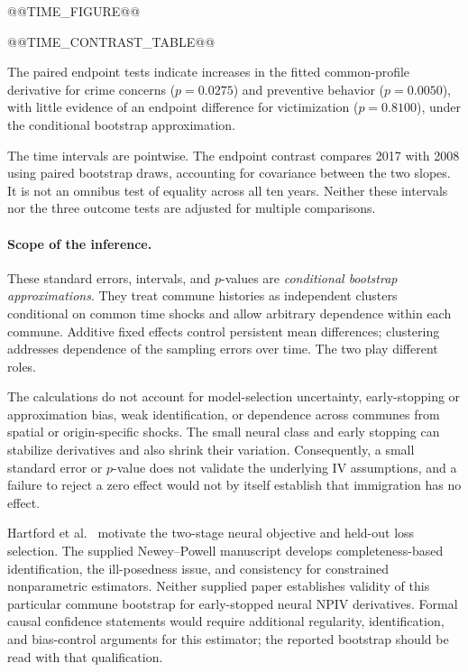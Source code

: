 @@TIME_FIGURE@@

@@TIME_CONTRAST_TABLE@@

The paired endpoint tests indicate increases in the fitted common-profile derivative for crime concerns ($p=0.0275$) and preventive behavior ($p=0.0050$), with little evidence of an endpoint difference for victimization ($p=0.8100$), under the conditional bootstrap approximation.

The time intervals are pointwise. The endpoint contrast compares 2017 with 2008 using paired bootstrap draws, accounting for covariance between the two slopes. It is not an omnibus test of equality across all ten years. Neither these intervals nor the three outcome tests are adjusted for multiple comparisons.

\paragraph{Scope of the inference.}
These standard errors, intervals, and $p$-values are \emph{conditional bootstrap approximations}. They treat commune histories as independent clusters conditional on common time shocks and allow arbitrary dependence within each commune. Additive fixed effects control persistent mean differences; clustering addresses dependence of the sampling errors over time. The two play different roles.

The calculations do not account for model-selection uncertainty, early-stopping or approximation bias, weak identification, or dependence across communes from spatial or origin-specific shocks. The small neural class and early stopping can stabilize derivatives and also shrink their variation. Consequently, a small standard error or $p$-value does not validate the underlying IV assumptions, and a failure to reject a zero effect would not by itself establish that immigration has no effect.

Hartford et al.\ \cite{deepiv} motivate the two-stage neural objective and held-out loss selection. The supplied Newey--Powell manuscript \cite{neweypowell} develops completeness-based identification, the ill-posedness issue, and consistency for constrained nonparametric estimators. Neither supplied paper establishes validity of this particular commune bootstrap for early-stopped neural NPIV derivatives. Formal causal confidence statements would require additional regularity, identification, and bias-control arguments for this estimator; the reported bootstrap should be read with that qualification.

